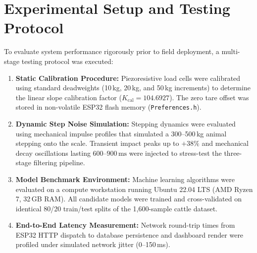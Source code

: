 \documentclass[11pt,a4paper]{report}
\begin{document}
\section{Experimental Setup and Testing Protocol}
To evaluate system performance rigorously prior to field deployment, a multi-stage testing protocol was executed:
\begin{enumerate}
    \item \textbf{Static Calibration Procedure:} Piezoresistive load cells were calibrated using standard deadweights (10\,kg, 20\,kg, and 50\,kg increments) to determine the linear slope calibration factor ($K_{\text{cal}} = 104.6927$). The zero tare offset was stored in non-volatile ESP32 flash memory (\texttt{Preferences.h}).
    \item \textbf{Dynamic Step Noise Simulation:} Stepping dynamics were evaluated using mechanical impulse profiles that simulated a 300--500\,kg animal stepping onto the scale. Transient impact peaks up to $+38\%$ and mechanical decay oscillations lasting $600\text{--}900\,\text{ms}$ were injected to stress-test the three-stage filtering pipeline.
    \item \textbf{Model Benchmark Environment:} Machine learning algorithms were evaluated on a compute workstation running Ubuntu 22.04 LTS (AMD Ryzen 7, 32\,GB RAM). All candidate models were trained and cross-validated on identical 80/20 train/test splits of the 1,600-sample cattle dataset.
    \item \textbf{End-to-End Latency Measurement:} Network round-trip times from ESP32 HTTP dispatch to database persistence and dashboard render were profiled under simulated network jitter (0--150\,ms).
\end{enumerate}
\end{document}
